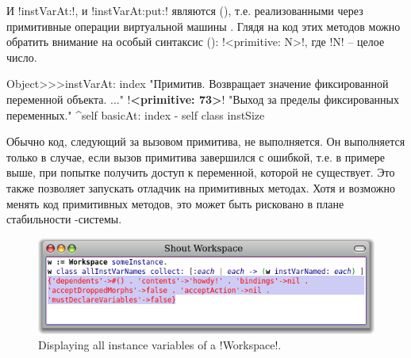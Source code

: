 \documentclass[a4paper,10pt,twoside]{book}
\begin{document}
И \ct!instVarAt:!, и \ct!instVarAt:put:! являются  (), т.е. реализованными через примитивные операции виртуальной машины \pharo.
Глядя на код этих методов можно обратить внимание на особый синтаксис  (): \ct!<primitive: N>!, где \ct!N! -- целое число.

\begin{code}{}
Object>>>instVarAt: index 
	"Примитив. Возвращает значение фиксированной переменной объекта. ..."
	!\textbf{<primitive: 73>}!
	"Выход за пределы фиксированных переменных."
	^self basicAt: index - self class instSize		
\end{code}

Обычно код, следующий за вызовом примитива, не выполняется.
Он выполняется только в случае, если вызов примитива завершился с ошибкой, т.е. в примере выше, при попытке получить доступ к переменной, которой не существует.
Это также позволяет запускать отладчик на примитивных методах.
Хотя и возможно менять код примитивных методов, это может быть рисковано в плане стабильности \pharo-системы.

\begin{figure}[ht]\centering
	\includegraphics[width=\linewidth]{allInstanceVariables}
	\caption{Displaying all instance variables of a \ct!Workspace!.}
\end{figure}
\end{document}
